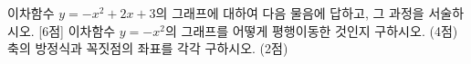 이차함수 $y=-x^2+2x+3$의 그래프에 대하여 다음 물음에 답하고, 그 과정을 서술하시오. \mbox{[6점]}
 이차함수 $y=-x^2$의 그래프를 어떻게 평행이동한 것인지 구하시오. (4점)
 축의 방정식과 꼭짓점의 좌표를 각각 구하시오. (2점)
